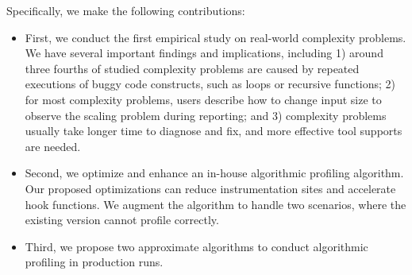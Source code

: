 



Specifically, we make the following contributions:

\begin{itemize}

\item First, we conduct the first empirical study on real-world complexity problems. 
We have several important findings and implications, including
1) around three fourths of studied complexity problems are 
caused by repeated executions of buggy code constructs,
such as loops or recursive functions;
2) for most complexity problems, 
users describe how to change input size to observe the scaling problem during reporting;
and 3) complexity problems usually take longer time to diagnose and fix, 
and more effective tool supports are needed.  

\item Second, we optimize and enhance an in-house algorithmic profiling algorithm.
Our proposed optimizations 
can reduce instrumentation sites and accelerate hook functions.
We augment the algorithm to handle two scenarios, 
where the existing version cannot profile correctly. 





\item Third, we propose two approximate algorithms to conduct algorithmic profiling in production runs. 

\end{itemize}

